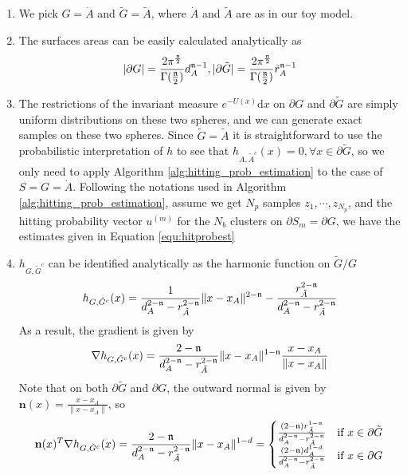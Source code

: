 \documentclass[english, aip, jcp, priprint, graphicx,floatfix]{revtex4-1}
\theoremstyle{plain}
\theoremstyle{definition}
\theoremstyle{plain}
\begin{document}
\begin{enumerate}
	\item We pick $G = \dot{A}$ and $\tilde{G} = \tilde{A}$, where $\dot{A}$ and $\tilde{A}$ are as in our toy model.
	\item The surfaces areas can be easily calculated analytically as
\[|\partial G| = \frac{2\pi^{\frac{{\mathfrak{n}}}{2}}}{\Gamma(\frac{{\mathfrak{n}}}{2})}d_A^{{\mathfrak{n}} - 1}, |\partial \tilde{G}| = \frac{2\pi^{\frac{{\mathfrak{n}}}{2}}}{\Gamma(\frac{{\mathfrak{n}}}{2})}\tilde{r}_A^{{\mathfrak{n}} - 1}\]
	\item The restrictions of the invariant measure $e^{- U (x)} \mathrm{d} x$ on $\partial G$ and $\partial \tilde{G}$ are simply uniform distributions on these two spheres, and we can generate exact samples on these two spheres. Since $\tilde{G} = \tilde{A}$ it is straightforward to use the probabilistic interpretation of $h$ to see that $h_{A, \tilde{A}^c} (x) = 0, \forall x \in \partial \tilde{G}$, so we only need to apply Algorithm \ref{alg:hitting_prob_estimation} to the case of $S=G=\dot{A}$. Following the notations used in Algorithm \ref{alg:hitting_prob_estimation}, assume we get $N_p$ samples $z_1,\cdots, z_{N_p}$, and the hitting probability vector $u^{(m)}$ for the $N_b$ clusters on $\partial S_m = \partial G$, we have the estimates given in Equation \ref{equ:hitprobest}
	\item $h_{G, \tilde{G}^c}$ can be identified analytically as the harmonic function on $\tilde{G} / G$\cite{Wendel1980-sj}
\[ h_{G, \tilde{G}^c} (x) = \frac{1}{d_A^{2 - {\mathfrak{n}}} - r_{\tilde{A}}^{2 - {\mathfrak{n}}}} \| x
- x_A \|^{2 - {\mathfrak{n}}} - \frac{r_{\tilde{A}}^{2 - {\mathfrak{n}}}}{d_A^{2 - {\mathfrak{n}}} -
r_{\tilde{A}}^{2 - {\mathfrak{n}}}} \]
As a result, the gradient is given by
\[ \nabla h_{G, \tilde{G}^c} (x) = \frac{2 - {\mathfrak{n}}}{d_A^{2 - {\mathfrak{n}}} - r_{\tilde{A}}^{2
   - {\mathfrak{n}}}} \| x - x_A \|^{1 - {\mathfrak{n}}} \frac{x - x_A}{\| x - x_A \|} \]
Note that on both $\partial \tilde{G}$ and $\partial G$, the outward normal is
given by ${\textbf{n}} (x) = \frac{x - x_A}{\| x - x_A \|}$, so
\[
	{\textbf{n}} (x)^T \nabla h_{G, \tilde{G}^c} (x) = \frac{2 - {\mathfrak{n}}}{d_A^{2 - {\mathfrak{n}}} - r_{\tilde{A}}^{2 - {\mathfrak{n}}}} \| x - x_A \|^{1 - d} = 
\begin{cases}
	\frac{(2 - {\mathfrak{n}}) r_{\tilde{A}}^{1 - {\mathfrak{n}}}}{d_A^{2 - {\mathfrak{n}}} - r_{\tilde{A}}^{2 - {\mathfrak{n}}}} & \text{if }x \in \partial \tilde{G}\\
	\frac{(2 - {\mathfrak{n}}) d_A^{1 - d}}{d_A^{2 - {\mathfrak{n}}} - r_{\tilde{A}}^{2 - {\mathfrak{n}}}} & \text{if }x \in \partial G

\end{cases}\]
\end{enumerate}
\end{document}
